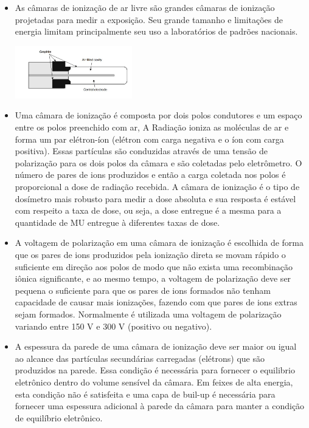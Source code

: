 \documentclass[11pt,a4paper]{article}
\newcounter{exemplo}
\begin{document}
\begin{exemplo}
\begin{itemize}
        \item As câmaras de ionização de ar livre são grandes câmaras de ionização projetadas para medir a exposição. Seu grande tamanho e limitações de energia limitam principalmente seu uso a laboratórios de padrões nacionais.
        

        \begin{center}
            \includegraphics[width=0.4\textwidth]{Imagens/camaraDeIonização.JPG}
        \end{center}
        
        \item Uma câmara de ionização é composta por dois polos condutores e um espaço entre os polos preenchido com ar, A Radiação ioniza as moléculas de ar e forma um par elétron-íon (elétron com carga negativa e o íon com carga positiva). Essas partículas são conduzidas através de uma tensão de polarização para os dois polos da câmara e são coletadas pelo eletrômetro. O número de pares de ions produzidos e então a carga coletada nos polos é proporcional a dose de radiação recebida. A câmara de ionização é o tipo de dosímetro mais robusto para medir a dose absoluta e sua resposta é estável com respeito a taxa de dose, ou seja, a dose entregue é a mesma para a quantidade de MU entregue à diferentes taxas de dose.
        
        \item A voltagem de polarização em uma câmara de ionização é escolhida de forma que os pares de ions produzidos pela ionização direta se movam rápido o suficiente em direção aos polos de modo que não exista uma recombinação iônica significante, e ao mesmo tempo, a voltagem de polarização deve ser pequena o suficiente para que os pares de ions formados não tenham capacidade de causar mais ionizações, fazendo com que pares de ions extras sejam formados.  Normalmente é utilizada uma voltagem de polarização variando entre 150 V e 300 V (positivo ou negativo).
        
        \item A espessura da parede de uma câmara de ionização deve ser maior ou igual ao alcance das partículas secundárias carregadas (elétrons) que são produzidos na parede. Essa condição é necessária para fornecer o equilibrio eletrônico dentro do volume sensível da câmara. Em feixes de alta energia, esta condição não é satisfeita e uma capa de buil-up é necessária para fornecer uma espessura adicional à parede da câmara para manter a condição de equilíbrio eletrônico.
        

\end{itemize}
\end{exemplo}
\end{document}
